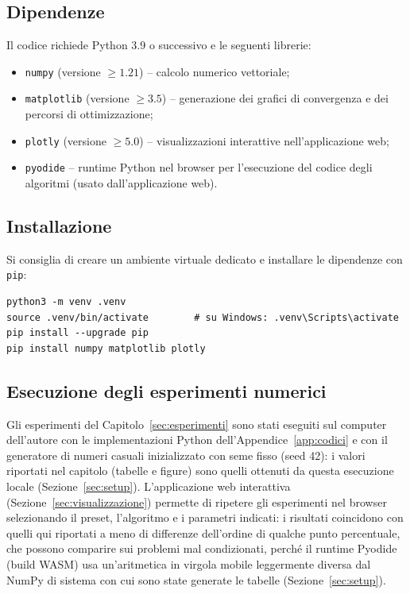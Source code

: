 \documentclass[a4paper,12pt]{article}
\numberwithin{equation}{section}
\numberwithin{figure}{section}
\numberwithin{table}{section}
\begin{document}
\subsection{Dipendenze}

Il codice richiede Python 3.9 o successivo e le seguenti librerie:

\begin{itemize}
  \item \texttt{numpy} (versione $\geq 1.21$) -- calcolo numerico vettoriale;
  \item \texttt{matplotlib} (versione $\geq 3.5$) -- generazione dei grafici
  di convergenza e dei percorsi di ottimizzazione;
  \item \texttt{plotly} (versione $\geq 5.0$) -- visualizzazioni interattive
  nell'applicazione web;
  \item \texttt{pyodide} -- runtime Python nel browser per l'esecuzione del
  codice degli algoritmi (usato dall'applicazione web).
\end{itemize}

\subsection{Installazione}

Si consiglia di creare un ambiente virtuale dedicato e installare le
dipendenze con \texttt{pip}:

\begin{verbatim}
python3 -m venv .venv
source .venv/bin/activate        # su Windows: .venv\Scripts\activate
pip install --upgrade pip
pip install numpy matplotlib plotly
\end{verbatim}

\subsection{Esecuzione degli esperimenti numerici}

Gli esperimenti del Capitolo~\ref{sec:esperimenti} sono stati eseguiti sul
computer dell'autore con le implementazioni Python dell'Appendice~\ref{app:codici}
e con il generatore di numeri casuali inizializzato con seme fisso (seed 42):
i valori riportati nel capitolo (tabelle e figure) sono quelli ottenuti da
questa esecuzione locale (Sezione~\ref{sec:setup}). L'applicazione web
interattiva (Sezione~\ref{sec:visualizzazione}) permette di ripetere gli
esperimenti nel browser selezionando il preset, l'algoritmo e i parametri
indicati: i risultati coincidono con quelli qui riportati a meno di differenze
dell'ordine di qualche punto percentuale, che possono comparire sui problemi
mal condizionati, perché il runtime Pyodide (build WASM) usa un'aritmetica in
virgola mobile leggermente diversa dal NumPy di sistema con cui sono state
generate le tabelle (Sezione~\ref{sec:setup}).
\end{document}
